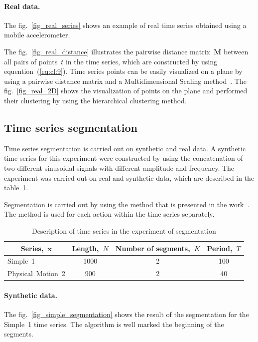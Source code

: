 \documentclass[12pt, twoside]{article}
\numberwithin{equation}{section}
\begin{document}
\paragraph{Real data.}

The fig.~\ref{fig_real_series} shows an example of real time series obtained using a mobile accelerometer.

The fig.~\ref{fig_real_distance} illustrates the pairwise distance matrix~$\textbf{M}$ between all pairs of points~$t$ in the time series, which are constructed by using equention~(\ref{eq:cl:9}).
Time series points can be easily visualized on a plane by using a pairwise distance matrix and a Multidimensional Scaling method~\cite{Borg2005}.
The fig.~\ref{fig_real_2D} shows the visualization of points on the plane and performed their clustering by using the hierarchical clustering method.

\subsection{Time series segmentation}
Time series segmentation is carried out on synthetic and real data. 
A synthetic time series for this experiment were constructed by using the concatenation of two different sinusoidal signals with different amplitude and frequency.
The experiment was carried out on real and synthetic data, which are described in the table~\ref{table:3}.

Segmentation is carried out by using the method that is presented in the work~\cite{motrenko2015}. The method is used for each action within the time series separately.

\begin{table}[h!t]
\begin{center}
\caption{Description of time series in the experiment of segmentation}
\label{table:3}
\begin{tabular}{|c|c|c|c|}
\hline
	Series,~$\textbf{x}$ & Length,~$N$& Number of segments,~$K$& Period,~$T$\\
	\hline
	\multicolumn{1}{|l|}{Simple~1}
	& 1000& 2& 100\\
	\hline
	\multicolumn{1}{|l|}{Physical~Motion~2}
	& 900& 2& 40\\
\hline

\end{tabular}
\end{center}
\end{table}

\paragraph{Synthetic data.}
The fig.~\ref{fig_simple_segmentation} shows the result of the segmentation for the Simple~1 time series.
The algorithm is well marked the beginning of the segments.
\end{document}
